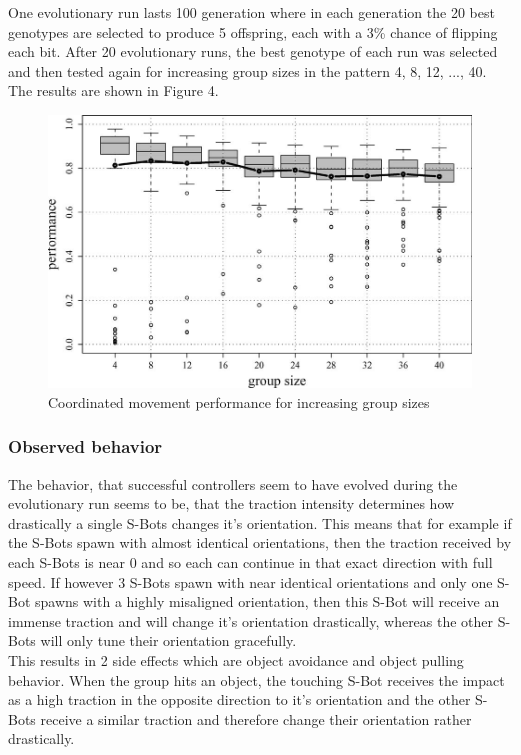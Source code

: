 One evolutionary run lasts 100 generation where in each generation the 20
best genotypes are selected to produce 5 offspring,
each with a 3\% chance of flipping each bit. After 20 evolutionary runs, the best genotype of each
run was selected and then tested again for increasing group sizes in the
pattern 4, 8, 12, ..., 40. The results are shown in Figure 4.

\begin{figure}[h]
  \centering
    \includegraphics[width=0.8\linewidth]{pics/15.png}
  \caption{Coordinated movement performance for increasing group sizes}
  \label{}
\end{figure}

\subsubsection{Observed behavior}
The behavior, that successful controllers seem to have evolved during the
evolutionary run seems to be, that the traction intensity determines how
drastically a single S-Bots changes it's orientation. This means that for
example if the S-Bots spawn with almost identical orientations, then the
traction received by each S-Bots is near 0 and so each can continue in that
exact direction with full speed. If however 3 S-Bots spawn with near identical
orientations and only one S-Bot spawns with a highly misaligned orientation,
then this S-Bot will receive an immense traction and will change it's
orientation drastically, whereas the other S-Bots will only tune their
orientation gracefully.
\ \\

This results in 2 side effects which are object avoidance and object pulling
behavior. When the group hits an object, the touching S-Bot receives the
impact as a high traction in the opposite direction to it's orientation and
the other S-Bots receive a similar traction and therefore change their
orientation rather drastically.
\ \\

